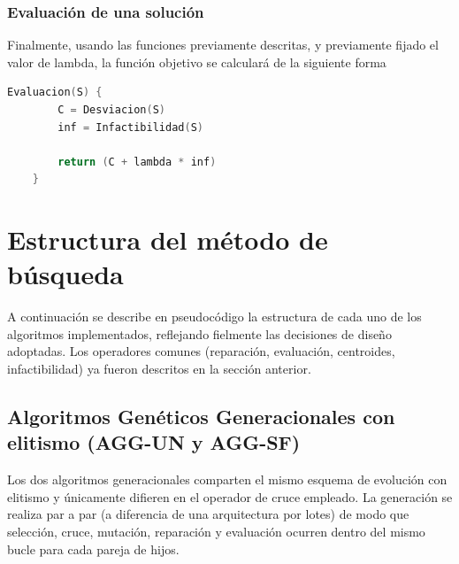 \documentclass[12pt]{article}
\begin{document}
    \subsubsection{Evaluación de una solución}
    Finalmente, usando las funciones previamente descritas, y previamente fijado el valor de lambda, la función objetivo se calculará de la siguiente forma
\begin{lstlisting}[language=C++, mathescape=true, caption={Pseudocódigo del cálculo de la función objetivo}, label={lst:infeasibility}]
Evaluacion(S) {
        C = Desviacion(S)
        inf = Infactibilidad(S)

        return (C + lambda * inf)
    }
\end{lstlisting}

    \newpage

    \section{Estructura del método de búsqueda}
 
A continuación se describe en pseudocódigo la estructura de cada uno de los
algoritmos implementados, reflejando fielmente las decisiones de diseño adoptadas.
Los operadores comunes (reparación, evaluación, centroides, infactibilidad) ya fueron
descritos en la sección anterior.
 
\subsection{Algoritmos Genéticos Generacionales con elitismo (AGG-UN y AGG-SF)}
 
Los dos algoritmos generacionales comparten el mismo esquema de evolución con
elitismo y únicamente difieren en el operador de cruce empleado.
La generación se realiza {par a par} (a diferencia de una arquitectura por
lotes) de modo que selección, cruce, mutación, reparación y evaluación ocurren dentro
del mismo bucle para cada pareja de hijos.
 
\end{document}
